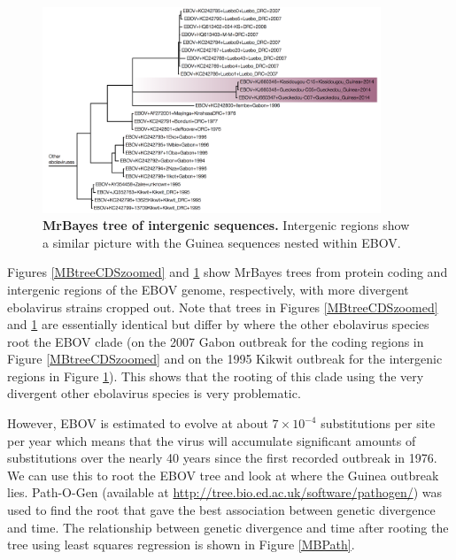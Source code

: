 \documentclass[11pt,oneside,letterpaper]{article}
\begin{document}
\begin{figure}[h!]
\centering  
\includegraphics[width=0.9\textwidth]  {figures/EBOV_intergenic_mb_tree.png}
\caption{\textbf{MrBayes tree of intergenic sequences.}
Intergenic regions show a similar picture with the Guinea sequences nested within EBOV.}
\label{MBtreeIG}
\end{figure}

Figures \ref{MBtreeCDSzoomed} and \ref{MBtreeIG} show MrBayes trees from protein coding and intergenic regions of the EBOV genome, respectively, with more divergent ebolavirus strains cropped out.
Note that trees in Figures \ref{MBtreeCDSzoomed} and \ref{MBtreeIG} are essentially identical but differ by where the other ebolavirus species root the EBOV clade (on the 2007 Gabon outbreak for the coding regions in Figure \ref{MBtreeCDSzoomed} and on the 1995 Kikwit outbreak for the intergenic regions in Figure \ref{MBtreeIG}). This shows that the rooting of this clade using the very divergent other ebolavirus species is very problematic. 

However, EBOV is estimated to evolve at about $7\times10^{-4}$ substitutions per site per year \cite{carroll2013} which means that the virus will accumulate significant amounts of substitutions over the nearly 40 years since the first recorded outbreak in 1976.
We can use this to root the EBOV tree and look at where the Guinea outbreak lies.
Path-O-Gen (available at \url{http://tree.bio.ed.ac.uk/software/pathogen/}) was used to find the root that gave the best association between genetic divergence and time.
The relationship between genetic divergence and time after rooting the tree using least squares regression is shown in Figure \ref{MBPath}.
\end{document}
